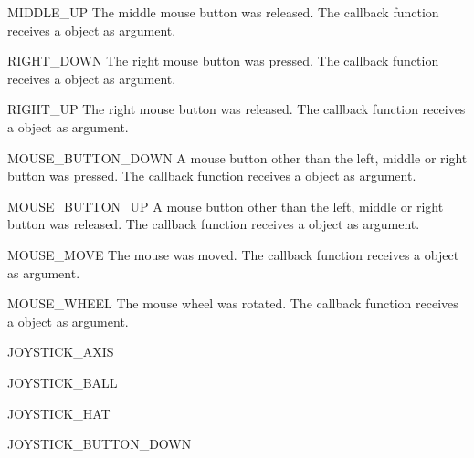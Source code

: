 \begin{datadesc}{MIDDLE_UP}
The middle mouse button was released. The callback function receives 
a  object as argument.
\end{datadesc}

\begin{datadesc}{RIGHT_DOWN}
The right mouse button was pressed. The callback function receives 
a  object as argument.
\end{datadesc}

\begin{datadesc}{RIGHT_UP}
The right mouse button was released. The callback function receives 
a  object as argument.
\end{datadesc}

\begin{datadesc}{MOUSE_BUTTON_DOWN}
A mouse button other than the left, middle or right button was pressed. The
callback function receives a  object as
argument.
\end{datadesc}

\begin{datadesc}{MOUSE_BUTTON_UP}
A mouse button other than the left, middle or right button was released. The
callback function receives a  object as
argument.
\end{datadesc}

\begin{datadesc}{MOUSE_MOVE}
The mouse was moved. The callback function receives a
 object as argument.
\end{datadesc}

\begin{datadesc}{MOUSE_WHEEL}
The mouse wheel was rotated. The callback function receives a
 object as argument.
\end{datadesc}

\begin{datadesc}{JOYSTICK_AXIS}
\end{datadesc}

\begin{datadesc}{JOYSTICK_BALL}
\end{datadesc}

\begin{datadesc}{JOYSTICK_HAT}
\end{datadesc}

\begin{datadesc}{JOYSTICK_BUTTON_DOWN}
\end{datadesc}

